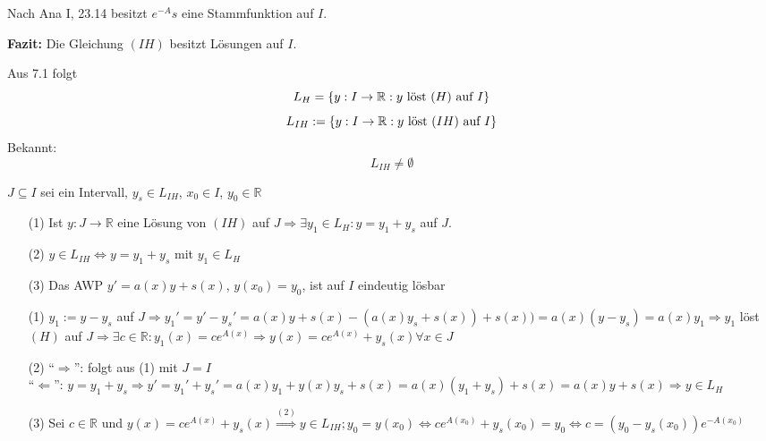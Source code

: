 \documentclass[a4paper,twoside,DIV15,BCOR12mm]{scrbook}
\begin{document}
Nach Ana I, 23.14 besitzt $e^{-A}s$ eine Stammfunktion auf $I$.

\textbf{Fazit:} Die Gleichung $(IH)$ besitzt Lösungen auf $I$.

Aus 7.1 folgt $$L_H = \{y: I \rightarrow \mathbb{R}: y \textnormal{ löst } (H) \textnormal{ auf } I \}$$
$$L_{IH} := \{y: I \rightarrow \mathbb{R}: y \textnormal{ löst } (IH) \textnormal{ auf } I\}$$
Bekannt: $$L_{IH} \ne \emptyset$$

\begin{satz}
$J \subseteq I$ sei ein Intervall, $y_s \in L_{IH}$, $x_0 \in I$, $y_0 \in \mathbb{R}$
\begin{itemize}
\item[(1)] Ist $y: J \rightarrow \mathbb{R}$ eine Lösung von $(IH)$ auf $J \Rightarrow \exists y_1 \in L_H: y = y_1 + y_s$ auf $J$.
\item[(2)] $y \in L_{IH} \Leftrightarrow y = y_1 + y_s$ mit $y_1 \in L_H$
\item[(3)] Das AWP $y'= a(x)y + s(x)$, $y(x_0) = y_0$, ist auf $I$ eindeutig lösbar
\end{itemize}
\end{satz}

\begin{beweis}
\begin{itemize}
\item[(1)] $y_1 := y - y_s $ auf $ J \Rightarrow y_1' = y' - y_s' = a(x)y + s(x) - (a(x)y_s + s(x)) + s(x)) = a(x)(y-y_s) = a(x)y_1 \Rightarrow y_1$ löst $(H)$ auf $J \Rightarrow \exists c \in \mathbb{R}: y_1(x) = c e^{A(x)} \Rightarrow y(x) = c e ^{A(x)} + y_s(x) \forall x \in J$
\item[(2)] "`$\Rightarrow$"': folgt aus (1) mit $J=I$ \\
"`$\Leftarrow$"': $y= y_1 + y_s \Rightarrow y' = y_1' + y_s' = a(x)y_1 + y(x) y_s + s(x) = a(x)(y_1 + y_s) + s(x) = a(x) y + s(x)
\Rightarrow y \in L_H$
\item[(3)] Sei $c \in \mathbb{R}$ und $y(x) = c e ^{A(x)} + y_s(x)
\stackrel{(2)}{\Rightarrow} y \in L_{IH}; y_0 = y(x_0) \Leftrightarrow c e ^{A(x_0)}+y_s(x_0)=y_0 \Leftrightarrow c = (y_0 - y_s(x_0))e^{-A(x_0)}$
\end{itemize}
\end{beweis}
\end{document}

